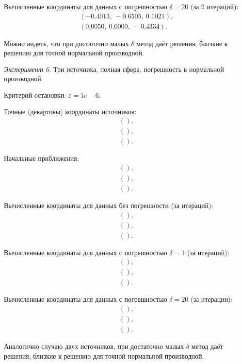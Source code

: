 Вычисленные координаты для данных с погрешностью $\delta=20$ (за 9 итераций):
\begin{align}
(-0.4013,\ -0.6505,\ 0.1021) \text{,}\nonumber\\
(0.0050,\ 0.0000,\ -0.4334) \text{.}\nonumber
\end{align}

Можно видеть, что при достаточно малых $\delta$ метод даёт решения, близкие к решению для точной нормальной производной.

\emph{Эксперимент 6.} Три источника, полная сфера, погрешность в нормальной производной.

Критерий остановки: $\varepsilon = 1e-6$.

Точные (декартовы) координаты источников:
\begin{align}
    () \text{,}\nonumber\\
    () \text{,}\nonumber\\
    () \text{.}\nonumber
\end{align}

Начальные приближения:
\begin{align}
    () \text{,}\nonumber\\
    () \text{,}\nonumber\\
    () \text{.}\nonumber
\end{align}

Вычисленные координаты для данных без погрешности (за  итераций):
\begin{align}
    () \text{,}\nonumber\\
    () \text{,}\nonumber\\
    () \text{.}\nonumber
\end{align}

Вычисленные координаты для данных с погрешностью $\delta=1$ (за  итераций):
\begin{align}
    () \text{,}\nonumber\\
    () \text{,}\nonumber\\
    () \text{.}\nonumber
\end{align}

Вычисленные координаты для данных с погрешностью $\delta=20$ (за  итерации):
\begin{align}
    () \text{,}\nonumber\\
    () \text{,}\nonumber\\
    () \text{.}\nonumber
\end{align}

Аналогично случаю двух источников, при достаточно малых $\delta$ метод даёт решения, близкие к решению для точной нормальной производной.
